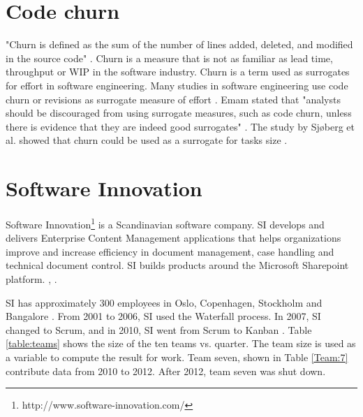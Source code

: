 \documentclass[UKenglish]{ifimaster}  %
\begin{document}
\section{Code churn}
\label{sec:Churn}
"Churn is defined as the sum of the number of lines added, deleted, and modified in the source code" \parencite{Dag}.
Churn is a measure that is not as familiar as lead time, throughput or WIP in the software industry. Churn is a term used as surrogates for effort in software engineering. Many studies in software engineering use code churn or revisions as surrogate measure of effort \parencite{yamashita2012quantifying}. Emam stated that "analysts should be discouraged from using surrogate measures, such as code churn, unless there is evidence that they are indeed good surrogates" \parencite{el2000methodology}. The study by Sj\o berg et al. showed that churn could be used as a surrogate for tasks size \parencite{yamashita2012quantifying}. 


\section{Software Innovation}
\label{sec:SI}
Software Innovation\footnote{http://www.software-innovation.com/} is a Scandinavian software company. SI develops and delivers Enterprise Content Management applications that helps organizations improve and increase efficiency in document management, case handling and technical document control. SI builds products around the Microsoft Sharepoint platform. \parencite{Dag}, \parencite{SI}.

SI has approximately 300 employees in Oslo, Copenhagen, Stockholm and Bangalore \parencite{SI}. From 2001 to 2006, SI used the Waterfall process. In 2007, SI changed to Scrum, and in 2010, SI went from Scrum to Kanban \parencite{Dag}.
\newpage
Table \ref{table:teams} shows the size of the ten teams vs. quarter. The team size is used as a variable to compute the result for work. Team seven, shown in Table \ref{Team:7} contribute data from 2010 to 2012. After 2012, team seven was shut down.
\end{document}
